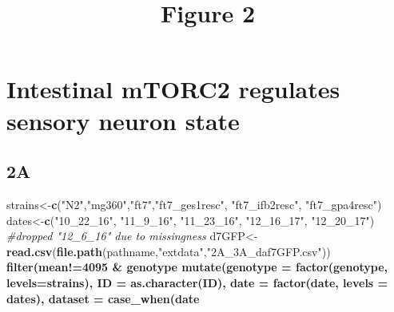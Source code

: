 \documentclass[]{article}
\title{Figure 2}
\author{}
\date{}
\newenvironment{Shaded}{\begin{snugshade}}{\end{snugshade}}
\newcommand{\KeywordTok}[1]{\textcolor[rgb]{0.13,0.29,0.53}{\textbf{#1}}}
\newcommand{\DataTypeTok}[1]{\textcolor[rgb]{0.13,0.29,0.53}{#1}}
\newcommand{\DecValTok}[1]{\textcolor[rgb]{0.00,0.00,0.81}{#1}}
\newcommand{\StringTok}[1]{\textcolor[rgb]{0.31,0.60,0.02}{#1}}
\newcommand{\CommentTok}[1]{\textcolor[rgb]{0.56,0.35,0.01}{\textit{#1}}}
\newcommand{\OperatorTok}[1]{\textcolor[rgb]{0.81,0.36,0.00}{\textbf{#1}}}
\newcommand{\NormalTok}[1]{#1}
\begin{document}
\maketitle

\section{\texorpdfstring{\textbf{Intestinal mTORC2 regulates sensory
neuron
state}}{Intestinal mTORC2 regulates sensory neuron state}}\label{intestinal-mtorc2-regulates-sensory-neuron-state}

\subsection{2A}\label{a}

\begin{Shaded}
\begin{Highlighting}[]
\NormalTok{strains<-}\KeywordTok{c}\NormalTok{(}\StringTok{"N2"}\NormalTok{,}\StringTok{"mg360"}\NormalTok{,}\StringTok{"ft7"}\NormalTok{,}\StringTok{"ft7_ges1resc"}\NormalTok{, }\StringTok{"ft7_ifb2resc"}\NormalTok{, }\StringTok{"ft7_gpa4resc"}\NormalTok{)}
\NormalTok{dates<-}\KeywordTok{c}\NormalTok{(}\StringTok{"10_22_16"}\NormalTok{, }\StringTok{"11_9_16"}\NormalTok{, }\StringTok{"11_23_16"}\NormalTok{, }\StringTok{"12_16_17"}\NormalTok{, }\StringTok{"12_20_17"}\NormalTok{) }\CommentTok{#dropped "12_6_16" due to missingness}
\NormalTok{d7GFP<-}\KeywordTok{read.csv}\NormalTok{(}\KeywordTok{file.path}\NormalTok{(pathname,}\StringTok{"extdata"}\NormalTok{,}\StringTok{"2A_3A_daf7GFP.csv"}\NormalTok{)) }\OperatorTok{%>%}
\StringTok{  }\KeywordTok{filter}\NormalTok{(mean}\OperatorTok{!=}\DecValTok{4095} \OperatorTok{&}\StringTok{ }\NormalTok{genotype }\OperatorTok{%in%}\StringTok{ }\NormalTok{strains }\OperatorTok{&}\StringTok{ }\NormalTok{date }\OperatorTok{%in%}\StringTok{ }\NormalTok{dates }\OperatorTok{&}\StringTok{ }\NormalTok{temp }\OperatorTok{==}\StringTok{ "27"} \OperatorTok{&}\StringTok{ }\NormalTok{food }\OperatorTok{==}\StringTok{ "OP50"}\NormalTok{) }\OperatorTok{%>%}
\StringTok{  }\KeywordTok{mutate}\NormalTok{(}\DataTypeTok{genotype =} \KeywordTok{factor}\NormalTok{(genotype, }\DataTypeTok{levels=}\NormalTok{strains), }
         \DataTypeTok{ID =} \KeywordTok{as.character}\NormalTok{(ID),}
         \DataTypeTok{date =} \KeywordTok{factor}\NormalTok{(date, }\DataTypeTok{levels =}\NormalTok{ dates),}
         \DataTypeTok{dataset =} \KeywordTok{case_when}\NormalTok{(date }\OperatorTok{%in%}\StringTok{ }\NormalTok{dates[}\DecValTok{1}\OperatorTok{:}\DecValTok{3}\NormalTok{] }\OperatorTok{~}\StringTok{ "1"}\NormalTok{,}
}}}
\end{Highlighting}
\end{Shaded}
\end{document}
